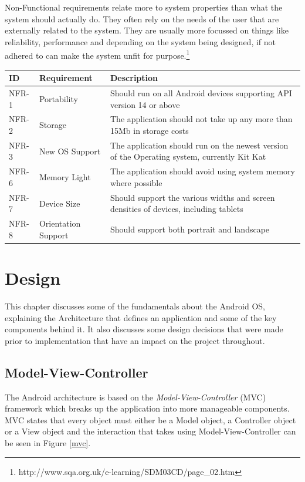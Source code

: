 \documentclass{l4proj}
\begin{document}
Non-Functional requirements relate more to system properties than what the system should actually do.  They often rely on the needs of the user that are externally related to the system.  They are usually more focussed on things like reliability, performance and depending on the system being designed, if not adhered to can make the system unfit for purpose.\footnote{http://www.sqa.org.uk/e-learning/SDM03CD/page\_02.htm}  

\begin{tabular}{| l | p{3.3cm} | p{11.6cm} | }
\hline
\textbf{ID} & \textbf{Requirement} & \textbf{Description} \\
\hline
\hline
NFR-1 & Portability & Should run on all Android devices supporting API version 14 or above\\
\hline
NFR-2 & Storage & The application should not take up any more than 15Mb in storage costs\\
\hline
NFR-3 & New OS Support & The application should run on the newest version of the Operating system, currently Kit Kat\\
\hline
NFR-6 & Memory Light & The application should avoid using system memory where possible\\
\hline
NFR-7 & Device Size & Should support the various widths and screen densities of devices, including tablets\\
\hline
NFR-8 & Orientation Support & Should support both portrait and landscape \\
\hline
\end{tabular}

\chapter{Design}

This chapter discusses some of the fundamentals about the Android OS, explaining the Architecture that defines an application and some of the key components behind it.  It also discusses some design decisions that were made prior to implementation that have an impact on the project throughout.

\section{Model-View-Controller}
The Android architecture is based on the \textit{Model-View-Controller }(MVC) framework which breaks up the application into more manageable components.  MVC states that every object must either be a Model object, a Controller object or a View object and the interaction that takes using Model-View-Controller can be seen in Figure \ref{mvc}.
\end{document}
